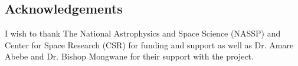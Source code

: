 \documentclass[a0,portrait]{a0poster}
\begin{document}
\begin{multicols}{2}


\section*{Acknowledgements}
I wish to thank The National Astrophysics and Space Science (NASSP) and  Center for Space Research (CSR) for funding and support as well as Dr. Amare Abebe  and Dr. Bishop Mongwane for their support with the project.




\end{multicols}
\end{document}
